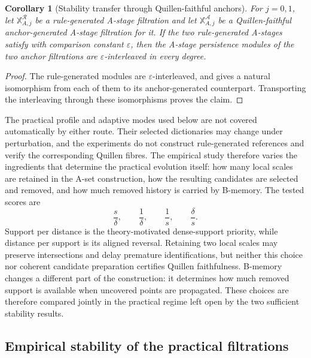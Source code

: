 \documentclass[a4paper,11pt]{article}
\newtheorem{corollary}[corollary]{Corollary}
\theoremstyle{definition}
\theoremstyle{remark}
\begin{document}
\begin{corollary}[Stability transfer through Quillen-faithful anchors]
\label{cor:quillen-stability-transfer}
For $j=0,1$, let $\mathbb X_{A,j}^{\mathcal R}$ be a rule-generated A-stage filtration and let $\mathbb X_{A,j}^{\mathcal A}$ be a Quillen-faithful anchor-generated A-stage filtration for it. If the two rule-generated A-stages satisfy  with comparison constant $\varepsilon$, then the A-stage persistence modules of the two anchor filtrations are $\varepsilon$-interleaved in every degree.
\end{corollary}

\begin{proof}
The rule-generated modules are $\varepsilon$-interleaved, and  gives a natural isomorphism from each of them to its anchor-generated counterpart. Transporting the interleaving through these isomorphisms proves the claim.
\end{proof}

The practical profile and adaptive modes used below are not covered automatically by either route. Their selected dictionaries may change under perturbation, and the experiments do not construct rule-generated references and verify the corresponding Quillen fibres. The empirical study therefore varies the ingredients that determine the practical evolution itself: how many local scales are retained in the A-set construction, how the resulting candidates are selected and removed, and how much removed history is carried by B-memory. The tested scores are
$$
\frac{s}{\delta},\qquad
\frac1\delta,\qquad
\frac1s,\qquad
\frac{\delta}{s}.
$$
Support per distance is the theory-motivated dense-support priority, while distance per support is its aligned reversal. Retaining two local scales may preserve intersections and delay premature identifications, but neither this choice nor coherent candidate preparation certifies Quillen faithfulness. B-memory changes a different part of the construction: it determines how much removed support is available when uncovered points are propagated. These choices are therefore compared jointly in the practical regime left open by the two sufficient stability results.

\subsection{Empirical stability of the practical filtrations}
\label{subsec:stability-guided-calibration}
\end{document}
